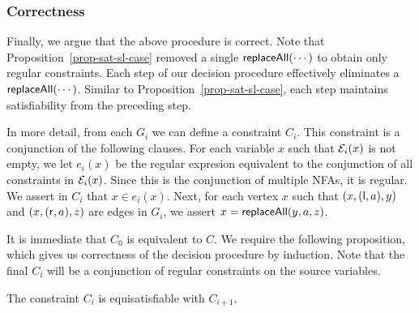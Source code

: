 



\subsubsection{Correctness}

Finally, we argue that the above procedure is correct.
Note that Proposition~\ref{prop-sat-sl-case} removed a single $\mathsf{replaceAll}(\cdots)$ to obtain only regular constraints.
Each step of our decision procedure effectively eliminates a $\mathsf{replaceAll}(\cdots)$.
Similar to Proposition~\ref{prop-sat-sl-case}, each step maintains satisfiability from the preceding step.

In more detail, from each $G_i$ we can define a constraint $C_i$.
This constraint is a conjunction of the following clauses.
For each variable $x$ such that $\mathcal{E}_i(x)$ is not empty, we let $e_i(x)$ be the regular expresion equivalent to the conjunction of all constraints in $\mathcal{E}_i(x)$.
Since this is the conjunction of multiple NFAs, it is regular.
We assert in $C_i$ that $x \in e_i(x)$.
Next, for each vertex $x$ such that $(x, (\mathsf{l}, a), y)$ and $(x, (\mathsf{r},a), z)$ are edges in $G_i$, we assert $x = \mathsf{replaceAll}(y, a, z)$.

It is immediate that $C_0$ is equivalent to $C$.
We require the following proposition, which gives us correctness of the decision procedure by induction.
Note that the final $C_i$ will be a conjunction of regular constraints on the source variables.

\begin{proposition}
    The constraint $C_i$ is equisatisfiable with $C_{i+1}$.
\end{proposition}

